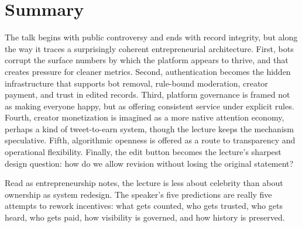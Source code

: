 \section{Summary}

The talk begins with public controversy and ends with record integrity, but along the way it traces a surprisingly coherent entrepreneurial architecture. First, bots corrupt the surface numbers by which the platform appears to thrive, and that creates pressure for cleaner metrics. Second, authentication becomes the hidden infrastructure that supports bot removal, rule-bound moderation, creator payment, and trust in edited records. Third, platform governance is framed not as making everyone happy, but as offering consistent service under explicit rules. Fourth, creator monetization is imagined as a more native attention economy, perhaps a kind of tweet-to-earn system, though the lecture keeps the mechanism speculative. Fifth, algorithmic openness is offered as a route to transparency and operational flexibility. Finally, the edit button becomes the lecture's sharpest design question: how do we allow revision without losing the original statement?

Read as entrepreneurship notes, the lecture is less about celebrity than about ownership as system redesign. The speaker's five predictions are really five attempts to rework incentives: what gets counted, who gets trusted, who gets heard, who gets paid, how visibility is governed, and how history is preserved.